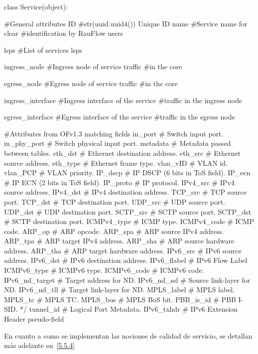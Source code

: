\begin{python}
class Service(object):

		#General attributes
		ID 				    #str(uuid.uuid4()) Unique ID 
		name 				#Service name for clear 
							#identification by RauFlow users
							
		lsps				#List of services lsps
		
		ingress_node		#Ingress node of service traffic 
							#in the core
							
		egress_node 		#Egress node of service traffic 
							#in the core
							
		ingress_interface 	#Ingress interface of the service 
							#traffic in the ingress node
							
		egress_interface 	#Egress interface of the service 
							#traffic in the egress node
        
		#Attributes from OFv1.3 matching fields
		in_port			# Switch input port.
		in_phy_port 	# Switch physical input port. 
		metadata 		# Metadata passed between tables. 
		eth_dst 		# Ethernet destination address.
		eth_src 		# Ethernet source address. 
		eth_type 		# Ethernet frame type. 
		vlan_vID 		# VLAN id. 
		vlan_PCP		# VLAN priority. 
		IP_dscp 		# IP DSCP (6 bits in ToS field). 
		IP_ecn  		# IP ECN (2 bits in ToS field). 
		IP_proto		# IP protocol. 
		IPv4_src 		# IPv4 source address. 
		IPv4_dst 		# IPv4 destination address. 
		TCP_src 		# TCP source port. 
		TCP_dst 		# TCP destination port. 
		UDP_src 		# UDP source port. 
		UDP_dst 		# UDP destination port. 
		SCTP_src 		# SCTP source port. 
		SCTP_dst 		# SCTP destination port. 
		ICMPv4_type 	# ICMP type. 
		ICMPv4_code 	# ICMP code. 
		ARP_op			# ARP opcode. 
		ARP_spa 		# ARP source IPv4 address. 
		ARP_tpa 		# ARP target IPv4 address. 
		ARP_sha 		# ARP source hardware address. 
		ARP_tha 		# ARP target hardware address. 
		IPv6_src 		# IPv6 source address. 
		IPv6_dst 		# IPv6 destination address. 
		IPv6_flabel 	# IPv6 Flow Label 
		ICMPv6_type 	# ICMPv6 type. 
		ICMPv6_code 	# ICMPv6 code. 
		IPv6_nd_target 	# Target address for ND. 
		IPv6_nd_ssl 	# Source link-layer for ND. 
		IPv6_nd_tll  	# Target link-layer for ND. 
		MPLS_label 		# MPLS label. 
		MPLS_tc 		# MPLS TC. 
		MPLS_bos		# MPLS BoS bit. 
		PBB_is_id 		# PBB I-SID. */
		tunnel_id 		# Logical Port Metadata. 
		IPv6_txhdr 		# IPv6 Extension Header pseudo-field 
		
\end{python}

En cuanto a como se implementan las nociones de calidad de servicio, se detallan m\'as adelante en~\ref{5.5.4} 

